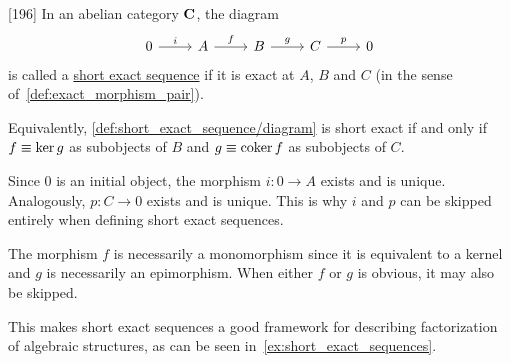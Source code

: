\begin{definition}\label{def:short_exact_sequence}\cite{MacLane1994}[196]
  In an abelian category $\operatorname{\mathbf{C}}$, the diagram
  \begin{equation}\label{def:short_exact_sequence/diagram}
    \begin{tikzcd}[baseline=(current bounding box.center)]
      0 \arrow[r, "i"] & A \arrow[r, "f"] & B \arrow[r, "g"] & C \arrow[r, "p"] & 0
    \end{tikzcd}
  \end{equation}
  is called a \uline{short exact sequence} if it is exact at $A$, $B$ and $C$ (in the sense of~\cref{def:exact_morphism_pair}).

  Equivalently, \cref{def:short_exact_sequence/diagram} is short exact if and only if $f \equiv \operatorname{ker} g$ as subobjects of $B$ and $g \equiv \operatorname{coker} f$ as subobjects of $C$.
\end{definition}

\begin{note}\label{note:short_exact_sequence_factorization}
  Since $0$ is an initial object, the morphism $i: 0 \to A$ exists and is unique. Analogously, $p: C \to 0$ exists and is unique. This is why $i$ and $p$ can be skipped entirely when defining short exact sequences.

  The morphism $f$ is necessarily a monomorphism since it is equivalent to a kernel and $g$ is necessarily an epimorphism. When either $f$ or $g$ is obvious, it may also be skipped.

  This makes short exact sequences a good framework for describing factorization of algebraic structures, as can be seen in~\cref{ex:short_exact_sequences}.
\end{note}

